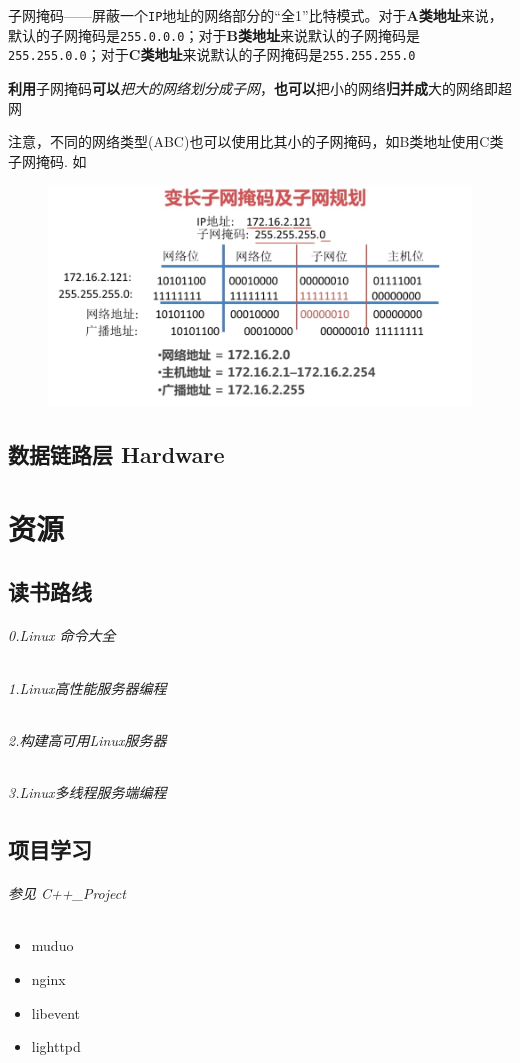 \documentclass[UTF8,a4paper,12pt]{ctexbook}
\begin{document}
			子网掩码——屏蔽一个\verb|IP|地址的网络部分的“全1”比特模式。对于\textbf{A类地址}来说，默认的子网掩码是\verb|255.0.0.0|；对于\textbf{B类地址}来说默认的子网掩码是\verb|255.255.0.0|；对于\textbf{C类地址}来说默认的子网掩码是\verb|255.255.255.0|
				
			\textbf{利用}子网掩码\textbf{可以}\textit{把大的网络划分成子网}，\textbf{也可以}把小的网络\textbf{归并成}大的网络即超网
			
			注意，不同的网络类型(ABC)也可以使用比其小的子网掩码，如B类地址使用C类子网掩码.
			如\begin{figure}[h]
				\centering
				\includegraphics[scale = 0.5]{figures/subNetMask.png}
			\end{figure}
			
	\section{数据链路层 Hardware}
	
	
	
\chapter{资源}    
\section{读书路线}
	\subparagraph{0.Linux 命令大全}
	\subparagraph{1.Linux高性能服务器编程}
	\subparagraph{2.构建高可用Linux服务器}
	\subparagraph{3.Linux多线程服务端编程}
\section{项目学习}
	\subparagraph{参见 C++\_Project}
		\begin{itemize}[itemindent = 1em]
			\item muduo
			\item nginx
			\item libevent
			\item lighttpd
		\end{itemize}
\end{document}
